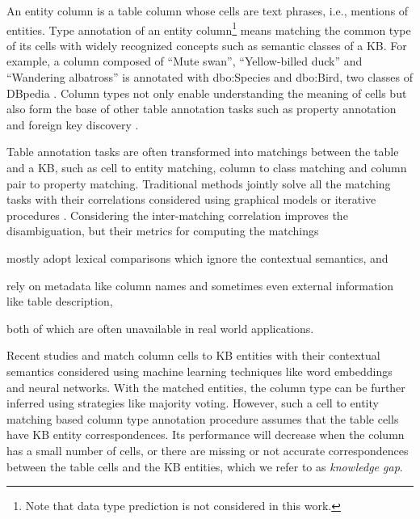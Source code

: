 \documentclass[letterpaper]{article}
\newcommand{\ernesto}[1]{{\color{black}#1}}
\newcommand{\rv}[1]{{\color{black}#1}}
\newcommand{\camera}[1]{{\color{black}#1}}
\begin{document}
An entity column is a table column whose cells are text phrases, i.e., mentions of entities.
Type annotation of an entity column\rv{\footnote{Note that data type prediction is not considered in this work.}} 
\camera{means matching}
the common type of its cells with widely recognized \rv{concepts such as semantic classes} of a KB. 
For example, a column composed of ``Mute swan'', ``Yellow-billed duck'' and ``Wandering albatross'' is annotated \rv{with} dbo:Species and dbo:Bird, 
two \rv{classes} of DBpedia \cite{auer2007dbpedia}. 
Column types not only enable 
understanding the meaning of cells 
but also \camera{form} the base of other table annotation tasks such as property annotation \cite{pham2016semantic} and foreign key discovery \cite{zhang2010multi}.

Table annotation tasks are often transformed into matchings between the table and a KB,
such as cell to entity matching, column to class matching and column pair to property matching. 
Traditional methods jointly solve all the matching tasks with their correlations considered using graphical models \cite{limaye2010annotating,mulwad2013semantic,bhagavatula2015tabel} or iterative procedures \cite{ritze2015matching,zhang2014towards,zhang2017effective}.
Considering the inter-matching correlation improves the disambiguation, 
but their metrics for computing the matchings 
\begin{inparaenum}[\it (i)]
\item mostly adopt lexical comparisons which ignore the contextual semantics, and 
\item rely on metadata like column names and sometimes even external information like table description, 
\end{inparaenum} 
both of which are often unavailable in real world applications.


Recent studies \cite{efthymiou2017matching} and \cite{luo2018cross} 
match column cells to KB entities with their contextual semantics considered using machine learning techniques like word embeddings and neural networks. 
With the matched entities, 
the column type can be further inferred using strategies like majority voting.
However, such a cell to entity matching based column type annotation procedure assumes that the table cells have KB entity correspondences. 
Its performance will decrease when the column has a small number of cells, 
\ernesto{or there are missing or not accurate correspondences} between the table cells and the KB entities, 
\rv{which we refer to as \textit{knowledge gap}.}
\end{document}
